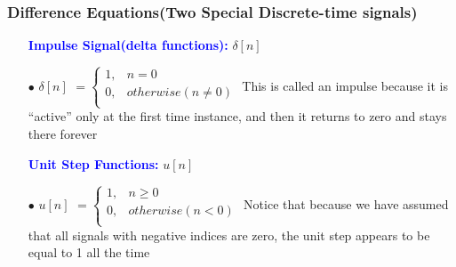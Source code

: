 \documentclass{beamer}
\newcommand{\blue}[1]{\textcolor{blue}{#1}}
\begin{document}
\begin{frame}


\frametitle{Difference Equations(Two Special Discrete-time signals)}


\begin{itemize} \itemsep6pt \parskip0pt 
  \item[] \blue{\bf Impulse Signal(delta functions):} $\delta[n]$
  \item[$\bullet$] $\delta[n]$ $=\begin{cases}
              1,&n=0\\
              0,&otherwise(n \neq 0)\\
            \end{cases}$ \newline
            This is called an impulse because it is “active” only at the first time instance, and then it returns to zero and stays there forever
  \item[] \blue{\bf Unit Step Functions:} $u[n]$
  \item[$\bullet$] $u[n]$ $=\begin{cases}
              1,&n \geq 0\\
              0,&otherwise(n < 0)\\
            \end{cases}$ \newline
             Notice that because we have assumed that all signals with negative indices are zero, the unit step appears to be equal to 1 all the time
\end{itemize}


\end{frame}


\end{document}
